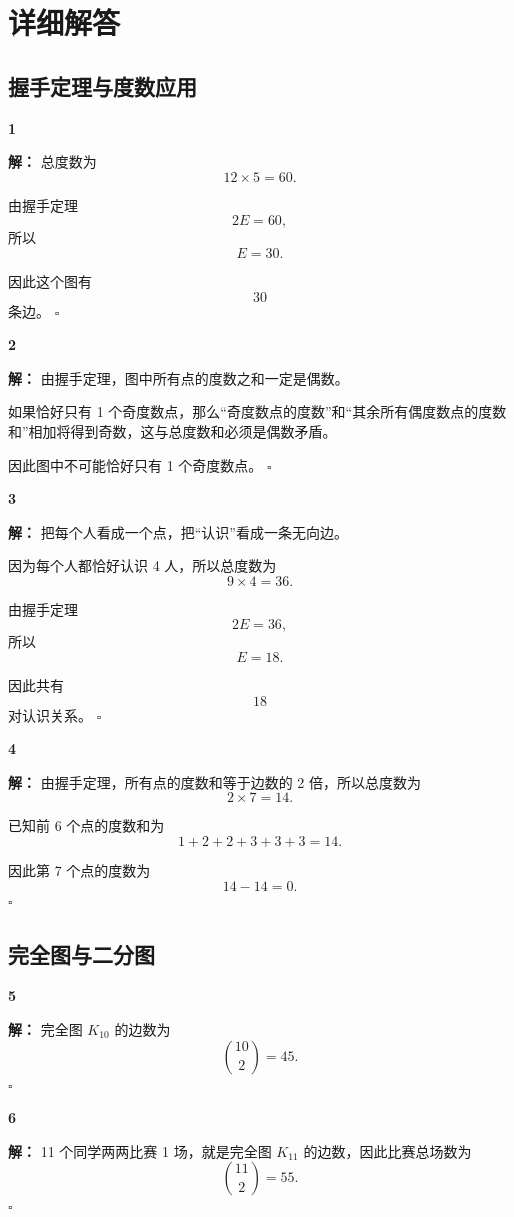 \documentclass[11pt,a4paper,fontset=fandol]{ctexart}
\theoremstyle{formalexample}
\newenvironment{solution}{\par\noindent\textbf{解：}}{\hfill$\square$\par}
\begin{document}
\newpage
\appendix
\section{详细解答}

\subsection*{握手定理与度数应用}

\textbf{1}\begin{solution}
总度数为
\[
12\times 5=60.
\]

由握手定理
\[
2E=60,
\]
所以
\[
E=30.
\]

因此这个图有
\[
30
\]
条边。
\end{solution}

\textbf{2}\begin{solution}
由握手定理，图中所有点的度数之和一定是偶数。

如果恰好只有 1 个奇度数点，那么“奇度数点的度数”和“其余所有偶度数点的度数和”相加将得到奇数，这与总度数和必须是偶数矛盾。

因此图中不可能恰好只有 1 个奇度数点。
\end{solution}

\textbf{3}\begin{solution}
把每个人看成一个点，把“认识”看成一条无向边。

因为每个人都恰好认识 4 人，所以总度数为
\[
9\times 4=36.
\]

由握手定理
\[
2E=36,
\]
所以
\[
E=18.
\]

因此共有
\[
18
\]
对认识关系。
\end{solution}

\textbf{4}\begin{solution}
由握手定理，所有点的度数和等于边数的 2 倍，所以总度数为
\[
2\times 7=14.
\]

已知前 6 个点的度数和为
\[
1+2+2+3+3+3=14.
\]

因此第 7 个点的度数为
\[
14-14=0.
\]
\end{solution}

\subsection*{完全图与二分图}

\textbf{5}\begin{solution}
完全图 $K_{10}$ 的边数为
\[
\binom{10}{2}=45.
\]
\end{solution}

\textbf{6}\begin{solution}
11 个同学两两比赛 1 场，就是完全图 $K_{11}$ 的边数，因此比赛总场数为
\[
\binom{11}{2}=55.
\]
\end{solution}
\end{document}
